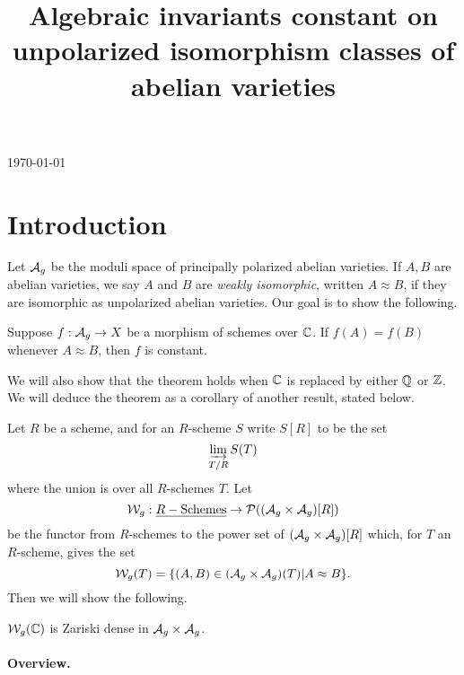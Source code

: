 \documentclass{amsart}
\title[Invariants constant on unpolarized isomorphism classes]{Algebraic invariants constant on unpolarized isomorphism classes of abelian varieties}
\begin{document}
\today
\tableofcontents
\maketitle

\section{Introduction}
\label{sec:introduction}

Let $\mathcal{A}_g$ be the moduli space of principally polarized abelian varieties. If $A, B$ are abelian varieties, we say $A$ and $B$ are \emph{weakly isomorphic}, written $A \approx B$, if they are isomorphic as unpolarized abelian varieties. Our goal is to show the following.
\begin{theorem}\label{thm:invariant-c-constant}
  Suppose $f: \mathcal{A}_g \to X$ be a morphism of schemes over $\mathbb{C}$. If $f(A) = f(B)$ whenever $A \approx B$, then $f$ is constant.
\end{theorem}
We will also show that the theorem holds when $\mathbb{C}$ is replaced by either $\mathbb{Q}$ or $\mathbb{Z}$. We will deduce the theorem as a corollary of another result, stated below.

Let $R$ be a scheme, and for an $R$-scheme $S$ write $S[R]$ to be the set
\[
  \varinjlim_{T/R} S(T)
\]
where the union is over all $R$-schemes $T$. Let
\[
  \mathcal{W}_g: \underline{R-\textrm{Schemes}} \to \mathcal{P}((\mathcal{A}_g \times \mathcal{A}_g)[R])
\]
be the functor from $R$-schemes to the power set of $(\mathcal{A}_g \times \mathcal{A}_g)[R]$ which, for $T$ an $R$-scheme, gives the set
\[
  \mathcal{W}_g(T) = \{(A,B) \in (\mathcal{A}_g \times \mathcal{A}_g)(T) | A \approx B\}.
\]
Then we will show the following.
\begin{theorem}\label{thm:sg-c-dense}
  $\mathcal{W}_g(\mathbb{C})$ is Zariski dense in $\mathcal{A}_g \times \mathcal{A}_g$.
\end{theorem}

\paragraph{Overview.}
\end{document}
